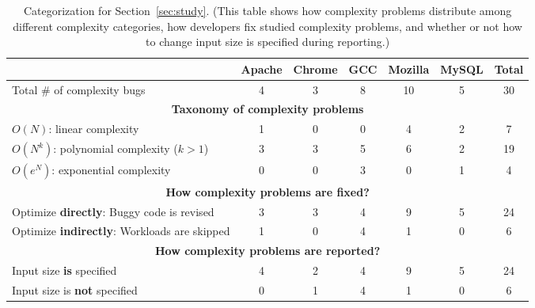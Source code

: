 \begin{table}[tb!]
\begin{adjustwidth}{-.5in}{-.5in}
\small
\centering
{
\begin{tabular}{|lcccccc|}
\hline
                                                                                  &   Apache  &   Chrome   &  GCC   &    Mozilla   &   MySQL  &  Total\\
\hline
Total \# of complexity bugs                                                       &   4       &    3       &   8    &    10        &   5      &   30 \\
\hline
\multicolumn{7}{|c|}{\bf Taxonomy of complexity problems}\\
\multicolumn{1}{|l}{{\bf $O(N)$}: linear complexity}                              &   1       &    0       &   0    &    4         &   2      &   7\\
\multicolumn{1}{|l}{{\bf $O(N^k)$}: polynomial complexity ($k>1$)}                &   3       &    3       &   5    &    6         &   2      &  19\\
\multicolumn{1}{|l}{{\bf $O(e^N)$}: exponential complexity}                       &   0       &    0       &   3    &    0         &   1      &   4\\
\hline
\multicolumn{7}{|c|}{\bf How complexity problems are fixed?}\\
\multicolumn{1}{|l}{Optimize {\bf directly}: Buggy code is revised}              &  3        &    3       &   4    &    9         &   5      &  24 \\
\multicolumn{1}{|l}{Optimize {\bf indirectly}: Workloads are skipped}              &  1        &    0       &   4    &    1         &   0      &   6\\
\hline
\multicolumn{7}{|c|}{\bf How complexity problems are reported?}\\
\multicolumn{1}{|l}{Input size {\bf is} specified}                                &  4        &    2       &   4    &    9    &5   &24\\
\multicolumn{1}{|l}{Input size is {\bf not} specified}                            &  0        &    1       &   4    &    1    &0   &6\\
\hline
\end{tabular}
}
\end{adjustwidth}
\caption{Categorization for Section~\ref{sec:study}.
\footnotesize{(This table shows how complexity problems distribute among different complexity categories, how developers fix studied complexity problems,  
 and whether or not how to change input size is specified during reporting.)}}
\label{tab:study}
\vspace{-0.4in}
\end{table}